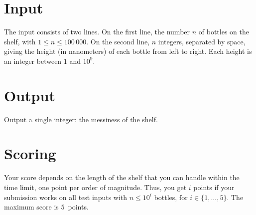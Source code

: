 \section*{Input}

The input consists of two lines.
On the first line, the number $n$ of bottles on the shelf, with $1\leq n\leq 100\,000$.
On the second line, $n$ integers, separated by space, giving the height (in nanometers) of each bottle from left to right.
Each height is an integer between $1$ and $10^9$.

\section*{Output}

Output a single integer: the messiness of the shelf.

\section*{Scoring}

Your score depends on the length of the shelf that you can handle within the time limit, one point per order of magnitude.
Thus, you get $i$ points if your submission works on all test inputs with $n\leq 10^i$ bottles, for $i\in\{1,\ldots, 5\}$.
The maximum score is $5$~points.

